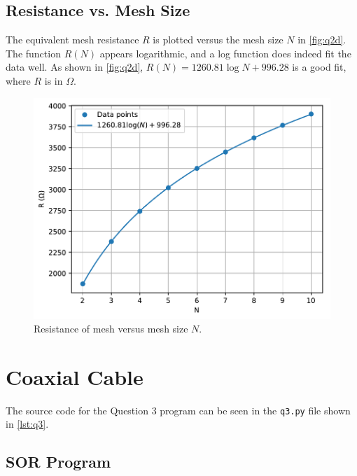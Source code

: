\documentclass[a4paper,titlepage]{article}
\begin{document}
	\subsection{Resistance vs. Mesh Size}
	
	The equivalent mesh resistance $R$ is plotted versus the mesh size $N$ in \autoref{fig:q2d}. The function $R(N)$ appears logarithmic, and a log function does indeed fit the data well. As shown in \autoref{fig:q2d}, $R(N) = 1260.81\log{N} + 996.28$ is a good fit, where $R$ is in $\Omega$.
	
	\begin{figure}[!htb]
		\centering
		\includegraphics[width=\columnwidth]{plots/q2d.pdf}
		\caption
		{Resistance of mesh versus mesh size $N$.}
		\label{fig:q2d}
	\end{figure}
	
	\section{Coaxial Cable}
	
	The source code for the Question 3 program can be seen in the \texttt{q3.py} file shown in \autoref{lst:q3}.
	
	\subsection{SOR Program}
	
\end{document}
